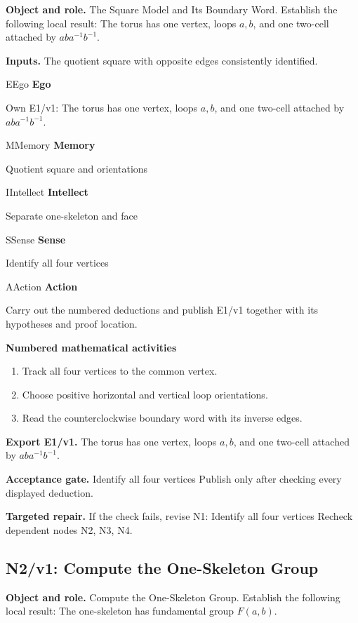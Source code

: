 \documentclass[preprint,12pt,aps,pra,showkeys,amsmath,amssymb,superscriptaddress,floatfix]{revtex4-2}
\theoremstyle{definition}
\theoremstyle{remark}
\newcommand{\mmfaculty}[3]{%
 \begin{mmfacultybox}{#1}{#2}
 {\sffamily\bfseries\color{MMBlue}#2}\par\smallskip #3
 \end{mmfacultybox}}
\newcommand{\field}[2]{\par\smallskip\noindent\textbf{#1.} #2\par}
\begin{document}
\field{Object and role}{The Square Model and Its Boundary Word. Establish the following local
result: The torus has one vertex, loops \(a,b\), and one two-cell
attached by \(aba^{-1}b^{-1}\).}

\field{Inputs}{The quotient square with opposite edges consistently identified.}

\mmfaculty{E}{Ego}{Own E1/v1: The torus has one vertex, loops \(a,b\), and one two-cell
attached by \(aba^{-1}b^{-1}\).}

\mmfaculty{M}{Memory}{Quotient square and orientations}

\mmfaculty{I}{Intellect}{Separate one-skeleton and face}

\mmfaculty{S}{Sense}{Identify all four vertices}

\mmfaculty{A}{Action}{Carry out the numbered deductions and publish E1/v1 together with its
hypotheses and proof location.}

\smallskip\noindent\textbf{Numbered mathematical activities}

\begin{enumerate}[label=N1.\arabic*,leftmargin=3.4em]

\item Track all four vertices to the common vertex.

\item Choose positive horizontal and vertical loop orientations.

\item Read the counterclockwise boundary word with its inverse edges.

\end{enumerate}

\field{Export E1/v1}{The torus has one vertex, loops \(a,b\), and one two-cell attached by
\(aba^{-1}b^{-1}\).}

\field{Acceptance gate}{Identify all four vertices Publish only after checking every displayed
deduction.}

\field{Targeted repair}{If the check fails, revise N1: Identify all four vertices Recheck
dependent nodes N2, N3, N4.}

\clearpage

\subsection{N2/v1: Compute the One-Skeleton Group}

\field{Object and role}{Compute the One-Skeleton Group. Establish the following local result:
The one-skeleton has fundamental group \(F(a,b)\).}
\end{document}
